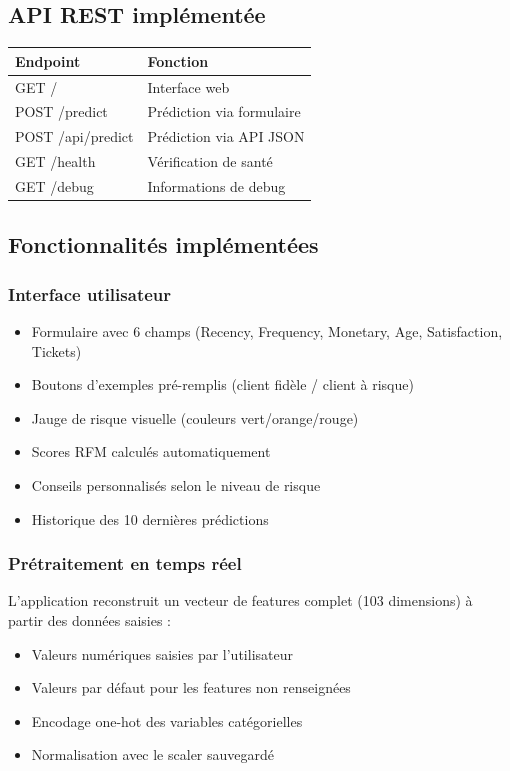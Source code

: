\documentclass[11pt,a4paper]{article}
\begin{document}
\subsection{API REST implémentée}
\begin{tcolorbox}[title=�� Endpoints disponibles]
\begin{tabular}{L{5cm} L{5cm}}
\toprule
\textbf{Endpoint} & \textbf{Fonction} \\
\midrule
GET / & Interface web \\
POST /predict & Prédiction via formulaire \\
POST /api/predict & Prédiction via API JSON \\
GET /health & Vérification de santé \\
GET /debug & Informations de debug \\
\bottomrule
\end{tabular}
\end{tcolorbox}

\subsection{Fonctionnalités implémentées}

\subsubsection{Interface utilisateur}
\begin{itemize}
    \item Formulaire avec 6 champs (Recency, Frequency, Monetary, Age, Satisfaction, Tickets)
    \item Boutons d'exemples pré-remplis (client fidèle / client à risque)
    \item Jauge de risque visuelle (couleurs vert/orange/rouge)
    \item Scores RFM calculés automatiquement
    \item Conseils personnalisés selon le niveau de risque
    \item Historique des 10 dernières prédictions
\end{itemize}

\subsubsection{Prétraitement en temps réel}
L'application reconstruit un vecteur de features complet (103 dimensions) à partir 
des données saisies :
\begin{itemize}
    \item Valeurs numériques saisies par l'utilisateur
    \item Valeurs par défaut pour les features non renseignées
    \item Encodage one-hot des variables catégorielles
    \item Normalisation avec le scaler sauvegardé
\end{itemize}
\end{document}
